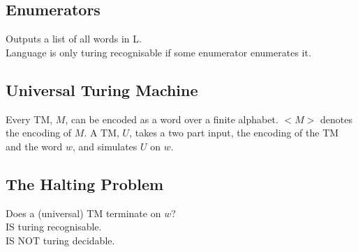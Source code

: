\subsection{Enumerators}
Outputs a list of all words in L.\\
Language is only turing recognisable if some enumerator enumerates it.

\subsection{Universal Turing Machine}
Every TM, $M$,  can be encoded as a word over a finite alphabet. $<M>$ denotes the encoding of $M$. A TM, $U$, takes a two part input, the encoding of the TM and the word $w$, and simulates $U$ on $w$.

\subsection{The Halting Problem}
Does a (universal) TM terminate on $w$?\\
IS turing recognisable.\\
IS NOT turing decidable.
